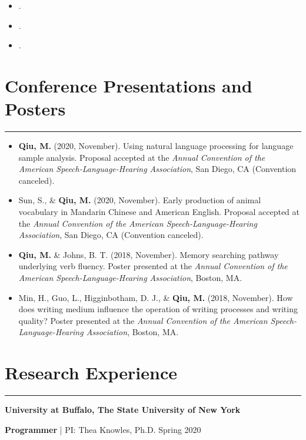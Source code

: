 \documentclass[11pt]{article}
\newcommand{\resumesection}[1]{\vspace{-0.2cm}\section*{#1}\vspace{-0.2cm}\hrule\vspace{0.2cm}}
\begin{document}
\begin{itemize}[leftmargin=!,labelindent=!,itemindent=-15pt]
\setlength\itemsep{0.3em}


\item[] .
\item[] .
\item[] . 
 
\end{itemize}

\resumesection{Conference Presentations and Posters}

\begin{itemize}[leftmargin=!,labelindent=!,itemindent=-15pt]
\setlength\itemsep{0.3em}
\item[] \textbf{Qiu, M.} (2020, November). Using natural language processing for language sample analysis. Proposal accepted at the \textit{Annual Convention of the American Speech-Language-Hearing Association}, San Diego, CA (Convention canceled).

\item[] Sun, S., \& \textbf{Qiu, M.} (2020, November). Early production of animal vocabulary in Mandarin Chinese and American English. Proposal accepted at the \textit{Annual Convention of the American Speech-Language-Hearing Association}, San Diego, CA (Convention canceled).

\item[] \textbf{Qiu, M.} \& Johns, B. T. (2018, November). Memory searching pathway underlying verb fluency. Poster presented at the \textit{Annual Convention of the American Speech-Language-Hearing Association}, Boston, MA.

\item[] Min, H., Guo, L., Higginbotham, D. J., \& \textbf{Qiu, M.} (2018, November). How does writing medium influence the operation of writing processes and writing quality? Poster presented at the \textit{Annual Convention of the American Speech-Language-Hearing Association}, Boston, MA.

\end{itemize}

\resumesection{Research Experience}
\textbf{University at Buffalo, The State University of New York}

\textbf{Programmer} | PI: Thea Knowles, Ph.D. \hfill Spring 2020
\end{document}
